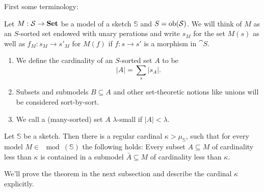 First some terminology:

\begin{Definition}
Let $M : \mathcal{S} \to \mathbf{Set}$ be a model of a sketch $\mathbb S$ and $S = \textrm{ob}(\mathcal{S})$. We will think of $M$ as an $S$-sorted set endowed with unary perations and write $s_M$ for the set $M(s)$ as well as $f_M : s_M \to s'_M$ for $M(f)$ if $f : s \to s'$ is a morphism in $\cat S$.
\begin{enumerate}
\item We define the cardinality of an $S$-sorted set $A$ to be \[ |A| = \sum_s |s_A|. \]
\item Subsets and submodels $B \subseteq A$ and other set-theoretic notions like unions will be considered sort-by-sort.
\item We call a (many-sorted) set $A$ $\lambda$-small if $|A|<\lambda$.
\end{enumerate}
\end{Definition}

\begin{Theorem}\label{thm:ls}
Let $\mathbb S$ be a sketch. Then there is a regular cardinal $\kappa > \mu_{\mathbb S}$, such that for every model $M \in \mod(\mathbb S)$ the following holds: Every subset $A \subseteq M$ of cardinality less than $\kappa$ is contained in a submodel $\bar A \subseteq M$ of cardinality less than $\kappa$.
\end{Theorem}
We'll prove the theorem in the next subsection and describe the cardinal $\kappa$ explicitly. \\

